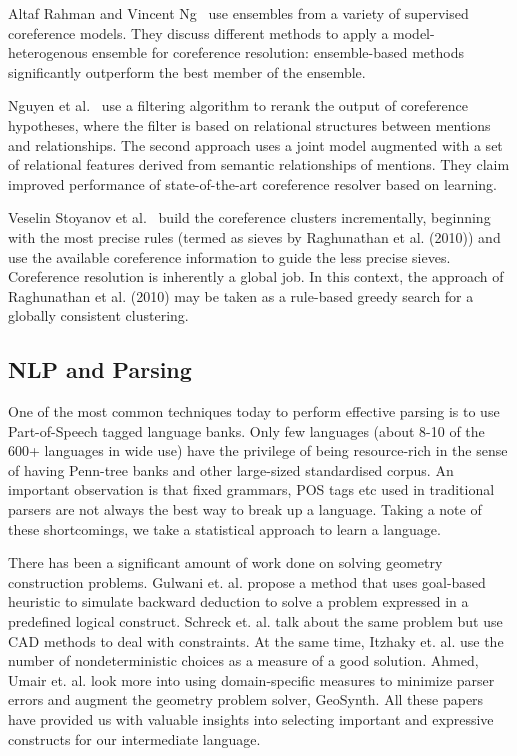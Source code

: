 \def\DevnagVersion{2.15}\documentclass[12pt]{article}
\begin{document}
Altaf Rahman and Vincent Ng~\cite{rahman-ng-11ijc_ensemble-based-coreference-resolution} use ensembles from a variety of supervised coreference models. They discuss different methods to apply a model-heterogenous ensemble for coreference resolution: ensemble-based methods significantly outperform the best member of the ensemble.

Nguyen et al.~\cite{nguyen-poesio-12coling_relational-coreference-resolution} use a filtering algorithm to rerank the output of coreference hypotheses, where the filter is based on relational structures between mentions and relationships. The second approach uses a joint model augmented with a set of relational features derived from semantic relationships of mentions. They claim improved performance of state-of-the-art coreference resolver based on learning.

Veselin Stoyanov et al.~\cite{stoyanov-eisneree-12coling_easy-first-coreference-resolution} build the coreference clusters incrementally, beginning with the most precise rules (termed as sieves by Raghunathan et al. (2010)) and use the available coreference information to guide the less precise sieves. Coreference resolution is inherently a global job. In this context, the approach of Raghunathan et al. (2010) may be taken as a rule-based greedy search for a globally consistent clustering.



\subsection{NLP and Parsing}
One of the most common techniques today to perform effective parsing is to use Part-of-Speech tagged language banks. Only few languages (about 8-10 of the 600+ languages in wide use) have the privilege of being resource-rich in the sense of having Penn-tree banks and other large-sized standardised corpus. An important observation is that fixed grammars, POS tags etc used in traditional parsers are not always the best way to break up a language. Taking a note of these shortcomings, we take a statistical approach to learn a language.

There has been a significant amount of work done on solving geometry construction problems. Gulwani et. al. \cite{gulwani2011synthesizing} propose a method that uses goal-based heuristic to simulate backward deduction to solve a problem expressed in a predefined logical construct. Schreck et. al. \cite{schreck2012geometric} talk about the same problem but use CAD methods to deal with constraints. At the same time, Itzhaky et. al. \cite{itzhaky2012solving} use the number of nondeterministic choices as a measure of a good solution. Ahmed, Umair et. al. \cite{ahmed2012can} look more into using domain-specific measures to minimize parser errors and augment the geometry problem solver, GeoSynth. All these papers have provided us with valuable insights into selecting important and expressive constructs for our intermediate language.
\end{document}
